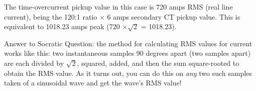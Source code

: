 \vskip 10pt

The time-overcurrent pickup value in this case is 720 amps RMS (real line current), being the 120:1 ratio $\times$ 6 amps secondary CT pickup value.  This is equivalent to 1018.23 amps peak (720 $\times \sqrt{2}$ = 1018.23).

\vskip 20pt

\noindent
Answer to Socratic Question: the method for calculating RMS values for current works like this: two instantaneous samples 90 degrees apart (two samples apart) are each divided by $\sqrt{2}$, squared, added, and then the sum square-rooted to obtain the RMS value.  As it turns out, you can do this on {\it any} two such samples taken of a sinusoidal wave and get the wave's RMS value!




